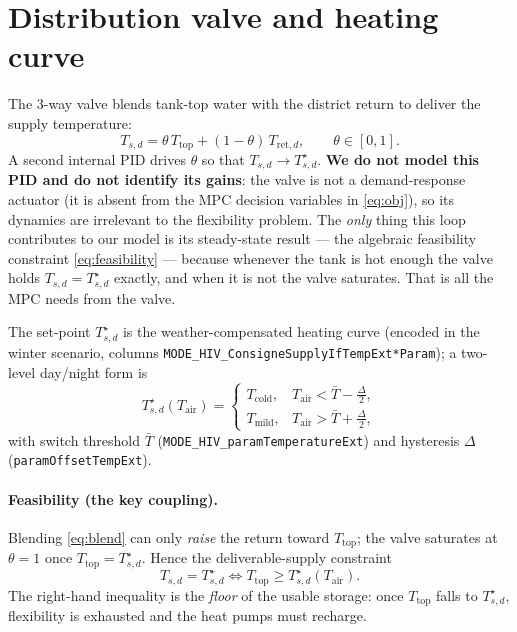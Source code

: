 \documentclass[11pt,a4paper]{article}
\newcommand{\Ttop}{T_{\mathrm{top}}}
\newcommand{\Tair}{T_{\mathrm{air}}}
\newcommand{\Tretd}{T_{\mathrm{ret},d}}
\newcommand{\Tsd}{T_{s,d}}         %
\newcommand{\Tsdref}{T_{s,d}^{\star}}
\newcommand{\code}[1]{\texttt{#1}}
\begin{document}
\section{Distribution valve and heating curve}
\label{sec:valve}

The 3-way valve blends tank-top water with the district return to deliver the
supply temperature:
\begin{equation}
  \Tsd = \theta\,\Ttop + (1-\theta)\,\Tretd, \qquad \theta\in[0,1]. \label{eq:blend}
\end{equation}
A second internal PID drives $\theta$ so that $\Tsd\to\Tsdref$. \textbf{We do not
model this PID and do not identify its gains}: the valve is not a demand-response
actuator (it is absent from the MPC decision variables in \eqref{eq:obj}), so its
dynamics are irrelevant to the flexibility problem. The \emph{only} thing this loop
contributes to our model is its steady-state result --- the algebraic feasibility
constraint \eqref{eq:feasibility} --- because whenever the tank is hot enough the
valve holds $\Tsd=\Tsdref$ exactly, and when it is not the valve saturates. That is
all the MPC needs from the valve.

The set-point $\Tsdref$ is the weather-compensated heating curve (encoded in the
winter scenario, columns \code{MODE\_HIV\_ConsigneSupplyIfTempExt*Param}); a
two-level day/night form is
\begin{equation}
  \Tsdref(\Tair) =
  \begin{cases}
    T_{\text{cold}}, & \Tair < \bar T - \tfrac{\Delta}{2},\\
    T_{\text{mild}}, & \Tair > \bar T + \tfrac{\Delta}{2},
  \end{cases}
  \label{eq:heatcurve}
\end{equation}
with switch threshold $\bar T$ (\code{MODE\_HIV\_paramTemperatureExt}) and hysteresis
$\Delta$ (\code{paramOffsetTempExt}).

\paragraph{Feasibility (the key coupling).}
Blending \eqref{eq:blend} can only \emph{raise} the return toward $\Ttop$; the
valve saturates at $\theta=1$ once $\Ttop=\Tsdref$. Hence the deliverable-supply
constraint
\begin{equation}
  \Tsd = \Tsdref \iff \Ttop \ge \Tsdref(\Tair).
  \label{eq:feasibility}
\end{equation}
The right-hand inequality is the \emph{floor} of the usable storage: once $\Ttop$
falls to $\Tsdref$, flexibility is exhausted and the heat pumps must recharge.
\end{document}
